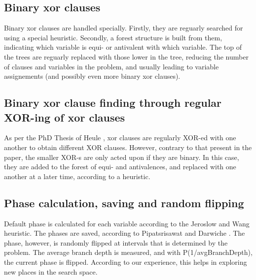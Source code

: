 \documentclass[final]{ieee}
\begin{document}
\subsection{Binary xor clauses}
Binary xor clauses are handled specially. Firstly, they are reguarly searched for using a special heuristic. Secondly, a forest structure is built from them, indicating which variable is equi- or antivalent with which variable. The top of the trees are reguarly replaced with those lower in the tree, reducing the number of clauses and variables in the problem, and usually leading to variable assignements (and possibly even more binary xor clauses).

\subsection{Binary xor clause finding through regular XOR-ing of xor clauses}
As per the PhD Thesis of Heule \cite{Heule-phd}, xor clauses are regularly XOR-ed with one another to obtain different XOR clauses. However, contrary to that present in the paper, the smaller XOR-s are only acted upon if they are binary. In this case, they are added to the forest of equi- and antivalences, and replaced with one another at a later time, according to a heuristic.

\subsection{Phase calculation, saving and random flipping}
Default phase is calculated for each variable according to the Jeroslow and Wang \cite{DBLP:journals/amai/JeroslowW90} heuristic. The phases are saved, according to Pipatsrisawat and Darwiche \cite{DBLP:conf/sat/PipatsrisawatD07}. The phase, however, is randomly flipped at intervals that is determined by the problem. The average branch depth is measured, and with P(1/avgBranchDepth), the current phase is flipped. According to our experience, this helps in exploring new places in the search space.

\end{document}
